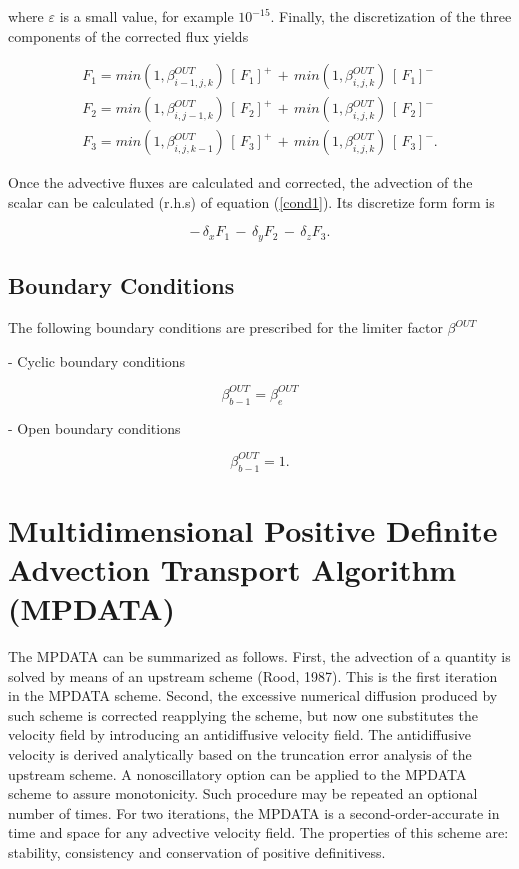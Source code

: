 \noindent where $\varepsilon$ is a small value, for example $10^{-15}$. Finally,
the discretization of the three components of the corrected flux yields

\begin{eqnarray}
{F_1} = min(1,\beta_{i-1,j,k}^{OUT})\,[\,F_1]^{+}\,+\,
min(1,\beta^{OUT}_{i,j,k})\,[\,F_1]^{-}\\
{F_2} = min(1,\beta_{i,j-1,k}^{OUT})\,[\,F_2]^{+}\,+\,
min(1,\beta^{OUT}_{i,j,k})\,[\,F_2]^{-}\\
{F_3} = min(1,\beta^{OUT}_{i,j,k-1})\,[\,F_3]^{+}\,+\,
min(1,\beta^{OUT}_{i,j,k})\,[\,F_3]^{-}.
\end{eqnarray}

Once the advective fluxes are calculated and corrected, the advection of the
scalar can be calculated (r.h.s) of equation (\ref{cond1}). Its discretize form
form is

\begin{equation}
-\,\delta_{x}F_1\,-\,\delta_{y}F_2\,-\,\delta_{z}F_3.
\end{equation}

\subsection{Boundary Conditions}

The following boundary conditions are prescribed for the limiter factor $\beta^{OUT}$

- Cyclic boundary conditions

\begin{equation}
\beta^{OUT}_{b-1}=\beta^{OUT}_{e}
\end{equation}

- Open boundary conditions

\begin{equation}
\beta^{OUT}_{b-1}=1.
\end{equation}

\section{Multidimensional Positive Definite Advection Transport Algorithm (MPDATA)}

The MPDATA can be summarized as follows.
First, the advection of a quantity is solved by means of an upstream scheme
(Rood, 1987). This is the first iteration in the MPDATA scheme.
Second, the excessive numerical diffusion produced by such scheme is
corrected reapplying the scheme, but now one substitutes the velocity field by
introducing an
antidiffusive velocity field. The antidiffusive velocity is derived analytically
based on the truncation error analysis of the upstream scheme.
A nonoscillatory option can be applied to the MPDATA scheme to assure monotonicity.
Such procedure may be repeated an optional number
of times. For two iterations, the  MPDATA is a second-order-accurate in time
and space for any
advective velocity field.
The properties
of this scheme are: stability, consistency and conservation of positive
definitivess.

